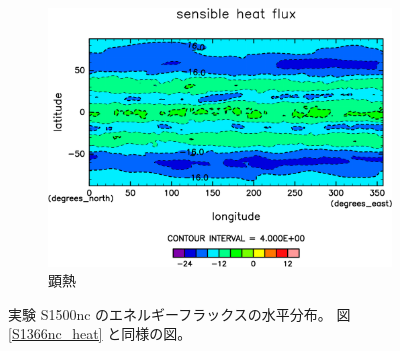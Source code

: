 \documentclass[body]{subfiles}
\begin{document}
\begin{figure}[t]
\begin{subfigure}{.4\textwidth}
		\includegraphics[width=\columnwidth]{S1500-nc/Sens,time=3650:4015-crop-rotate.pdf}
		\caption{顕熱\hmu*{[W/m^{-2}]}}\label{S1500nc顕熱}
	\end{subfigure}
	\caption[実験 S1500nc のエネルギーフラックスの水平分布]{
		実験 S1500nc のエネルギーフラックスの水平分布。
		図 \ref{S1366nc_heat} と同様の図。
	}\label{S1500nc_heat}
\end{figure}
\end{document}
